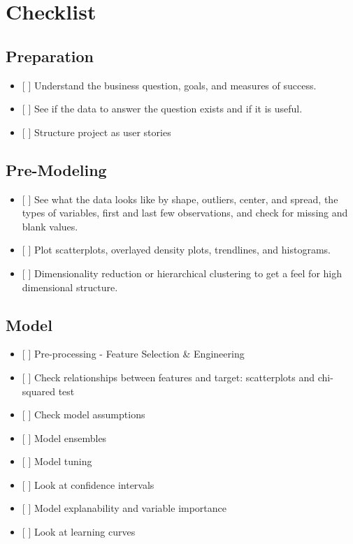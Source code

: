 \documentclass[]{book}
\begin{document}
\hypertarget{checklist}{%
\section{Checklist}\label{checklist}}

\hypertarget{preparation}{%
\subsection{Preparation}\label{preparation}}

\begin{itemize}
\item
  {[} {]} Understand the business question, goals, and measures of success.
\item
  {[} {]} See if the data to answer the question exists and if it is useful.
\item
  {[} {]} Structure project as user stories
\end{itemize}

\hypertarget{pre-modeling}{%
\subsection{Pre-Modeling}\label{pre-modeling}}

\begin{itemize}
\item
  {[} {]} See what the data looks like by shape, outliers, center, and spread, the types of variables, first and last few observations, and check for missing and blank values.
\item
  {[} {]} Plot scatterplots, overlayed density plots, trendlines, and histograms.
\item
  {[} {]} Dimensionality reduction or hierarchical clustering to get a feel for high dimensional structure.
\end{itemize}

\hypertarget{model}{%
\subsection{Model}\label{model}}

\begin{itemize}
\item
  {[} {]} Pre-processing - Feature Selection \& Engineering
\item
  {[} {]} Check relationships between features and target: scatterplots and chi-squared test
\item
  {[} {]} Check model assumptions
\item
  {[} {]} Model ensembles
\item
  {[} {]} Model tuning
\item
  {[} {]} Look at confidence intervals
\item
  {[} {]} Model explanability and variable importance
\item
  {[} {]} Look at learning curves
\end{itemize}
\end{document}
